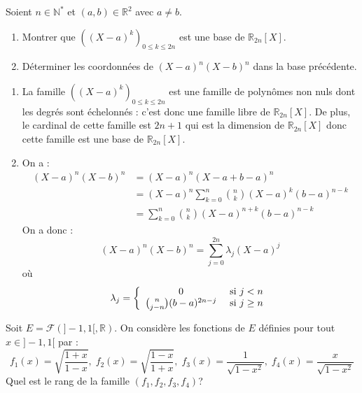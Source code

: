 \documentclass[a4paper,10pt]{report}
\begin{document}
\medskip


\begin{Exa} Soient $n \in \mathbb{N}^*$ et $(a,b) \in \mathbb{R}^2$ avec $a \neq b$.
\begin{enumerate}
\item Montrer que $((X-a)^k)_{0 \leq k \leq 2n}$ est une base de $\mathbb{R}_{2n}[X]$.
\item Déterminer les coordonnées de $(X-a)^n(X-b)^n$ dans la base précédente.
\end{enumerate}
\end{Exa} 

\corr 

\begin{enumerate}
\item La famille $((X-a)^k)_{0 \leq k \leq 2n}$ est une famille de polynômes non nuls dont les degrés sont échelonnés : c'est donc une famille libre de $\mathbb{R}_{2n}[X]$. De plus, le cardinal de cette famille est $2n+1$ qui est la dimension de $\mathbb{R}_{2n}[X]$ donc cette famille est une base de $\mathbb{R}_{2n}[X]$.
\item On a :
\begin{align*}
(X-a)^n(X-b)^n & = (X-a)^n (X-a + b-a)^n \\
& = (X-a)^n \sum_{k=0}^n \binom{n}{k} (X-a)^k (b-a)^{n-k} \\
& = \sum_{k=0}^n \binom{n}{k} (X-a)^{n+k} (b-a)^{n-k} 
\end{align*}
On a donc :
$$ (X-a)^n(X-b)^n = \sum_{j=0}^{2n} \lambda_j (X-a)^j$$
où 
$$ \lambda_j = \left\lbrace \begin{array}{ccl}
0 & \hbox{ si } j <n\\
\binom{n}{j-n} (b-a)^{2n-j} & \hbox{ si } j \geq n \\
\end{array}\right.$$
\end{enumerate}

\medskip

\begin{Exa} Soit $E = \mathcal{F}(]-1,1[, \mathbb{R})$. On considère les fonctions de $E$ définies pour tout $x \in ]-1,1[$ par : 
    \[
    f_1(x) = \sqrt {\frac{1 + x}{1 - x}} , \; f_2(x) = \sqrt {\frac{1 - x}{1 + x}} , \; f_3(x) = \frac{1}{\sqrt {1 - x^2}}, \; f_4(x) = \frac{x}{\sqrt {1 - x^2}}
    \]
Quel est le rang de la famille $(f_1 ,f_2 ,f_3 ,f_4)$?
\end{Exa}
\end{document}
